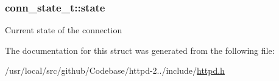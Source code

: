 \subsubsection[{\texorpdfstring{state}{state}}]{ conn\+\_\+state\+\_\+t\+::state}\hypertarget{structconn__state__t_a36f60000f8a31c0088dfdbf4f8ba272c}{}\label{structconn__state__t_a36f60000f8a31c0088dfdbf4f8ba272c}
Current state of the connection 

The documentation for this struct was generated from the following file\+:\begin{DoxyCompactItemize}
\item 
/usr/local/src/github/\+Codebase/httpd-\/2../include/\hyperlink{httpd_8h}{httpd.\+h}\end{DoxyCompactItemize}
